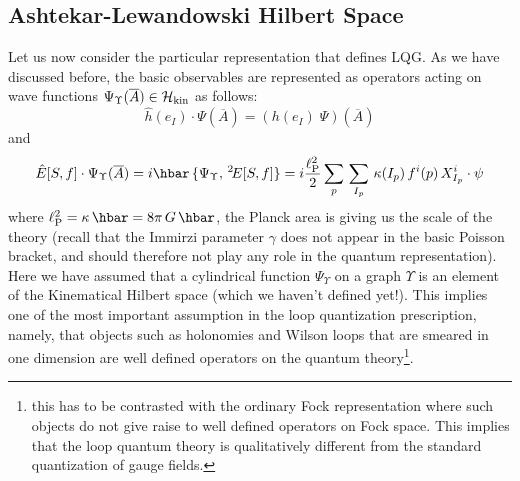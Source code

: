 \documentclass[aps,prd,tightenlines,showpacs,nofootinbib,preprint]{revtex4}
\def\be{\begin{equation}}
\def\ee{\end{equation}}
\def\g{{\gamma}}  \def\a{{\alpha}} \def\l{{\lambda}}
\def\bar{\overline}
\begin{document}
\subsection{Ashtekar-Lewandowski Hilbert Space}

Let us now consider the particular representation that defines
LQG. As we have discussed before, the basic observables are
represented as operators acting on wave functions
$\Psi_\Upsilon(\overline{A})\in{\cal H}_{\rm kin}$ as follows:
%
\be \hat{h}(e_I)\cdot
\Psi(\overline{A})=\left(h(e_I)\;\Psi\right)(\bar{A})
 \ee
%
and
%
\be\label{11} \hat{E}[S,f]\cdot\Psi_\Upsilon(\overline{A})=i\hbar\,
\{ \Psi_\Upsilon, \, {}^2\!E[S,f] \} = i\frac{\ell^2_{\rm P}}{2}
\sum_{p}\, \sum_{I_p}\, \kappa({I_p})\, f^i(p)\, X^i_{I_p}\cdot
\psi
\ee
%
where $\ell^2_{\rm P}=\kappa\,\hbar=8\pi\,G\,\hbar$,
the Planck area is giving us
the scale of the theory (recall that the Immirzi parameter $\g$
does not appear in the basic Poisson bracket, and should therefore
not play any role in the quantum representation). Here we have
assumed that a cylindrical function $\Psi_\Upsilon$ on a graph
$\Upsilon$ is an element of the Kinematical Hilbert space (which
we haven't defined yet!). This implies one of the most important
assumption in the loop quantization prescription, namely, that
objects such as holonomies and Wilson loops that are smeared in
one dimension are well defined operators on the quantum
theory\footnote{this has to be contrasted with the ordinary Fock
representation where such objects do not give raise to well
defined operators on Fock space. This implies that the loop
quantum theory is qualitatively different from the standard
quantization of gauge fields.}.
\end{document}
